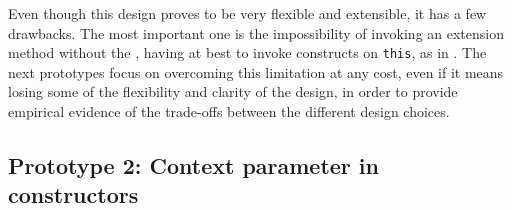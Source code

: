 



Even though this design proves to be very flexible and extensible, it has a few drawbacks.
%
The most important one is the impossibility of invoking an extension method without the , having at best to invoke constructs on \texttt{this}, as in .
%
The next prototypes focus on overcoming this limitation at any cost, even if it means losing some of the flexibility and clarity of the design, in order to provide empirical evidence of the trade-offs between the different design choices.





\subsection{Prototype 2: Context parameter in constructors} \label{chap:design->sec:dsl->subsec:prototype-2-implicit-parameter-in-constructors}


